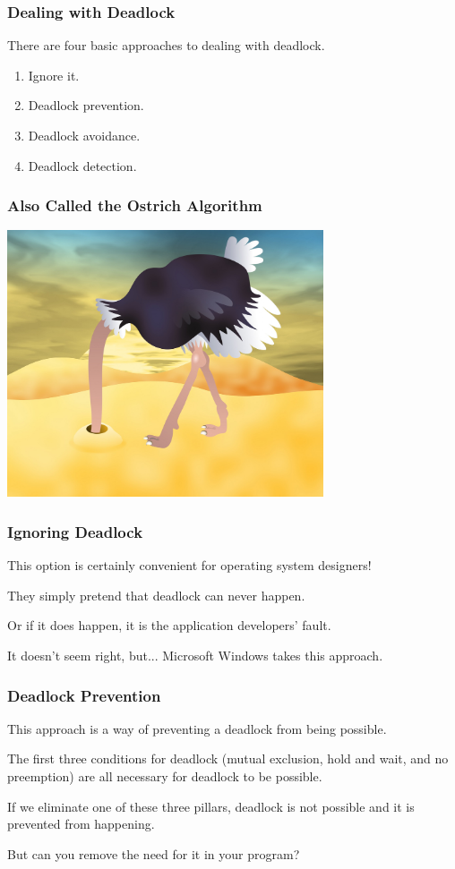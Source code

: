 \begin{frame}
\frametitle{Dealing with Deadlock}

There are four basic approaches to dealing with deadlock.

\begin{enumerate}
	\item Ignore it.
	\item Deadlock prevention.
	\item Deadlock avoidance.
	\item Deadlock detection.
\end{enumerate}

\end{frame}


\begin{frame}
\frametitle{Also Called the Ostrich Algorithm}

\begin{center}
	\includegraphics[width=0.7\textwidth]{images/ostrich-head-sand.jpg}
\end{center}


\end{frame}


\begin{frame}
\frametitle{Ignoring Deadlock}

This option is certainly convenient for operating system designers!

They simply pretend that deadlock can never happen. 

Or if it does happen, it is the application developers' fault. 

It doesn't seem right, but... Microsoft Windows takes this approach.

\end{frame}

\begin{frame}
\frametitle{Deadlock Prevention}

This approach is a way of preventing a deadlock from being possible. 

The first three conditions for deadlock (mutual exclusion, hold and wait, and no preemption) are all necessary for deadlock to be possible. 

If we eliminate one of these three pillars, deadlock is not possible and it is prevented from happening.

But can you remove the need for it in your program?

\end{frame}

